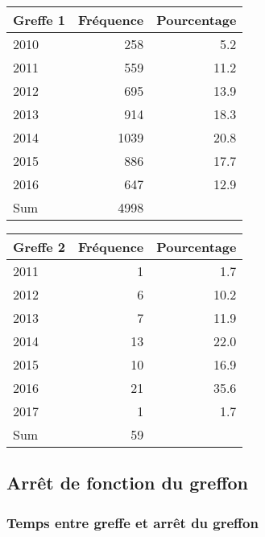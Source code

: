 \documentclass[11pt,a4paper]{article}\usepackage[]{graphicx}\usepackage[]{color}
\begin{document}
\begin{table}[H]
\centering
\begin{tabular}{lrr}
  \hline
Greffe 1 & Fréquence & Pourcentage \\ 
  \hline
2010 & 258 & 5.2 \\ 
  2011 & 559 & 11.2 \\ 
  2012 & 695 & 13.9 \\ 
  2013 & 914 & 18.3 \\ 
  2014 & 1039 & 20.8 \\ 
  2015 & 886 & 17.7 \\ 
  2016 & 647 & 12.9 \\ 
  Sum & 4998 &  \\ 
   \hline
\end{tabular}
\end{table}
\begin{table}[H]
\centering
\begin{tabular}{lrr}
  \hline
Greffe 2 & Fréquence & Pourcentage \\ 
  \hline
2011 &  1 & 1.7 \\ 
  2012 &  6 & 10.2 \\ 
  2013 &  7 & 11.9 \\ 
  2014 & 13 & 22.0 \\ 
  2015 & 10 & 16.9 \\ 
  2016 & 21 & 35.6 \\ 
  2017 &  1 & 1.7 \\ 
  Sum & 59 &  \\ 
   \hline
\end{tabular}
\end{table}



  \subsection{Arrêt de fonction du greffon}

    \subsubsection{Temps entre greffe et arrêt du greffon}
\end{document}
